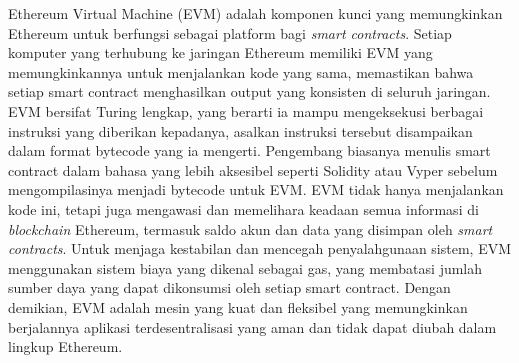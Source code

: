 Ethereum Virtual Machine (EVM) adalah komponen kunci yang memungkinkan Ethereum untuk berfungsi sebagai platform bagi \emph{smart contracts}. Setiap komputer yang terhubung ke jaringan Ethereum memiliki EVM yang memungkinkannya untuk menjalankan kode yang sama, memastikan bahwa setiap smart contract menghasilkan output yang konsisten di seluruh jaringan. EVM bersifat Turing lengkap, yang berarti ia mampu mengeksekusi berbagai instruksi yang diberikan kepadanya, asalkan instruksi tersebut disampaikan dalam format bytecode yang ia mengerti. Pengembang biasanya menulis smart contract dalam bahasa yang lebih aksesibel seperti Solidity atau Vyper sebelum mengompilasinya menjadi bytecode untuk EVM. EVM tidak hanya menjalankan kode ini, tetapi juga mengawasi dan memelihara keadaan semua informasi di \emph{blockchain} Ethereum, termasuk saldo akun dan data yang disimpan oleh \emph{smart contracts}. Untuk menjaga kestabilan dan mencegah penyalahgunaan sistem, EVM menggunakan sistem biaya yang dikenal sebagai gas, yang membatasi jumlah sumber daya yang dapat dikonsumsi oleh setiap smart contract. Dengan demikian, EVM adalah mesin yang kuat dan fleksibel yang memungkinkan berjalannya aplikasi terdesentralisasi yang aman dan tidak dapat diubah dalam lingkup Ethereum. \parencite{Dannen2017}

